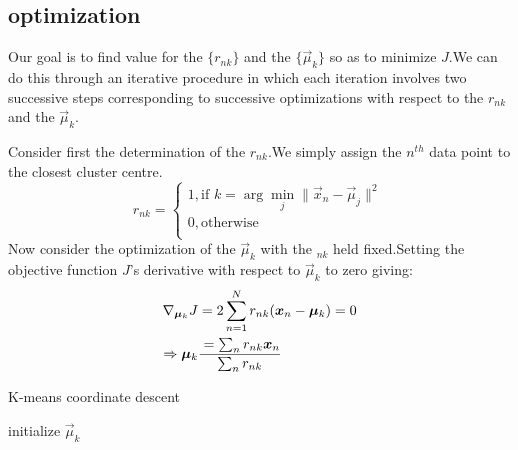 \subsection{optimization}
Our goal is to find value for the $\{r_{nk}\}$ and the $\{\vec{\mu}_k\}$ so as to minimize $J$.We can do this through an iterative procedure in which each iteration involves two successive steps corresponding to successive optimizations with respect to the $r_{nk}$ and the $\vec{\mu}_k$.

Consider first the determination of the $r_{nk}$.We simply assign the $n^{th}$ data point to the closest cluster centre.
\begin{equation}
r_{nk} = \begin{cases}
1,\text{if }k=\arg\min_j\parallel \vec{x}_n-\vec{\mu}_j\parallel^2 \\
0,\text{otherwise} \\
\end{cases}
\end{equation}
Now consider the optimization of the $\vec{\mu}_k$ with the $_{nk}$ held fixed.Setting the objective function $J$'s derivative with respect to $\vec{\mu}_k$ to zero giving:
\begin{align}
	\nabla_{\vec{\mu}_k} J
	&=2\sum_{n=1}^{N}r_{nk}(\vec{x}_n-\vec{\mu}_k)=0 \\
	\Rightarrow \vec{\mu}_k 
	&=\sum_n{r_{nk}\vec{x}_n} \over \sum_n{r_{nk}}
\end{align}

\begin{algorithm}
	\caption{{\sc K-means} coordinate descent}
	\label{algo:K-means}
	 initialize $\vec{\mu}_k$\;

\end{algorithm}


